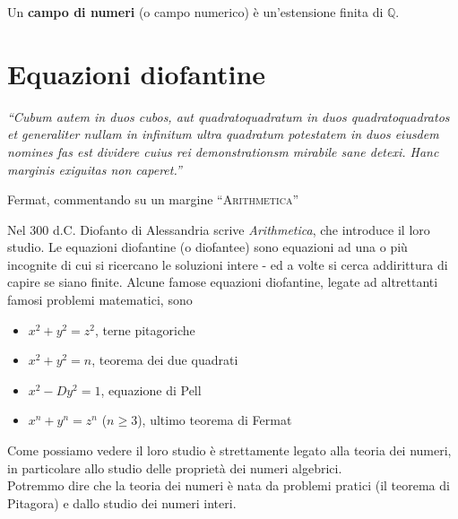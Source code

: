 \begin{definizione}
	Un \textbf{campo di numeri} (o campo numerico) è un'estensione finita di $\mathbb{Q}$.
\end{definizione}




\section{Equazioni diofantine}
\label{lezione16}
\epigraph{\textit{\enquote{Cubum autem in duos cubos, aut quadratoquadratum in duos quadratoquadratos et generaliter nullam in infinitum ultra quadratum potestatem in duos eiusdem nomines fas est dividere cuius rei demonstrationsm mirabile sane detexi. Hanc marginis exiguitas non caperet.}}}{Fermat, commentando su un margine \enquote{\textsc{Arithmetica}}}
Nel 300 d.C. Diofanto di Alessandria scrive \textit{Arithmetica}, che introduce il loro studio. Le equazioni diofantine (o diofantee) sono equazioni ad una o più incognite di cui si ricercano le soluzioni intere - ed a volte si cerca addirittura di capire se siano finite. Alcune famose equazioni diofantine, legate ad altrettanti famosi problemi matematici, sono
\begin{itemize}
	\item $x^2+y^2=z^2$, terne pitagoriche
	\item $x^2+y^2=n$, teorema dei due quadrati
	\item $x^2-Dy^2=1$, equazione di Pell
	\item $x^n+y^n=z^n$ ($n\geq3$), ultimo teorema di Fermat
\end{itemize}
Come possiamo vedere il loro studio è strettamente legato alla teoria dei numeri, in particolare allo studio delle {proprietà dei numeri algebrici}. \\ Potremmo dire che la teoria dei numeri è nata da problemi pratici (il teorema di Pitagora) e dallo studio dei numeri interi.
